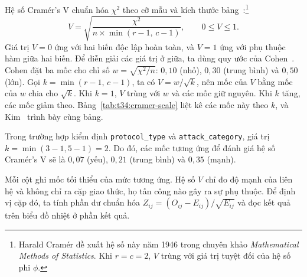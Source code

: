 \documentclass[../main.tex]{subfiles}
\begin{document}
Hệ số Cramér's V chuẩn hóa $\chi^2$ theo cỡ mẫu và kích thước bảng~\cite{task34_cramer1946}:\footnote{Harald Cramér đề xuất hệ số này năm 1946 trong chuyên khảo \textit{Mathematical Methods of Statistics}. Khi $r = c = 2$, $V$ trùng với giá trị tuyệt đối của hệ số phi $\phi$.}
\begin{equation}
  \label{eq:t34:cramers-v}
  V = \sqrt{\frac{\chi^2}{n \times \min(r - 1,\, c - 1)}}, \qquad 0 \leq V \leq 1.
\end{equation}
Giá trị $V = 0$ ứng với hai biến độc lập hoàn toàn, và $V = 1$ ứng với phụ thuộc hàm giữa hai biến. Để diễn giải các giá trị ở giữa, ta dùng quy ước của Cohen~\cite{task34_cohen1988}. Cohen đặt ba mốc cho chỉ số $w = \sqrt{\chi^2/n}$: $0{,}10$ (nhỏ), $0{,}30$ (trung bình) và $0{,}50$ (lớn). Gọi $k = \min(r - 1,\, c - 1)$, ta có $V = w/\sqrt{k}$, nên mốc của $V$ bằng mốc của $w$ chia cho $\sqrt{k}$. Khi $k = 1$, $V$ trùng với $w$ và các mốc giữ nguyên. Khi $k$ tăng, các mốc giảm theo. Bảng~\ref{tab:t34:cramer-scale} liệt kê các mốc này theo $k$, và Kim~\cite{task34_kim2017} trình bày cùng bảng.

\noindent Trong trường hợp kiểm định \texttt{protocol\_type} và \texttt{attack\_category}, giá trị $k = \min(3-1, 5-1) = 2$. Do đó, các mốc tương ứng để đánh giá hệ số Cramér's V sẽ là $0{,}07$ (yếu), $0{,}21$ (trung bình) và $0{,}35$ (mạnh).

Mỗi cột ghi mốc tối thiểu của mức tương ứng. Hệ số $V$ chỉ đo độ mạnh của liên hệ và không chỉ ra cặp giao thức, họ tấn công nào gây ra sự phụ thuộc. Để định vị cặp đó, ta tính phần dư chuẩn hóa $Z_{ij} = (O_{ij} - E_{ij})/\sqrt{E_{ij}}$ và đọc kết quả trên biểu đồ nhiệt ở phần kết quả.
\end{document}
